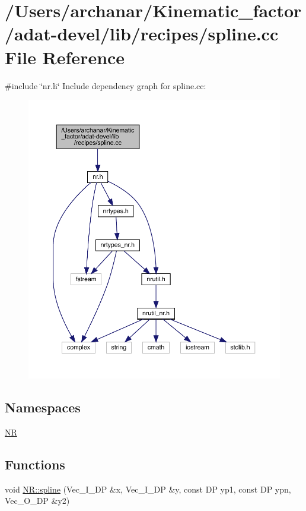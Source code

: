 \hypertarget{adat-devel_2lib_2recipes_2spline_8cc}{}\section{/\+Users/archanar/\+Kinematic\+\_\+factor/adat-\/devel/lib/recipes/spline.cc File Reference}
\label{adat-devel_2lib_2recipes_2spline_8cc}
{\ttfamily \#include \char`\"{}nr.\+h\char`\"{}}\newline
Include dependency graph for spline.\+cc\+:
\nopagebreak
\begin{figure}[H]
\begin{center}
\leavevmode
\includegraphics[width=350pt]{d2/d3c/adat-devel_2lib_2recipes_2spline_8cc__incl}
\end{center}
\end{figure}
\subsection*{Namespaces}
\begin{DoxyCompactItemize}
\item 
 \mbox{\hyperlink{namespaceNR}{NR}}
\end{DoxyCompactItemize}
\subsection*{Functions}
\begin{DoxyCompactItemize}
\item 
void \mbox{\hyperlink{namespaceNR_a5c106df532661250db9a1edaec21e355}{N\+R\+::spline}} (Vec\+\_\+\+I\+\_\+\+DP \&x, Vec\+\_\+\+I\+\_\+\+DP \&y, const DP yp1, const DP ypn, Vec\+\_\+\+O\+\_\+\+DP \&y2)
\end{DoxyCompactItemize}
